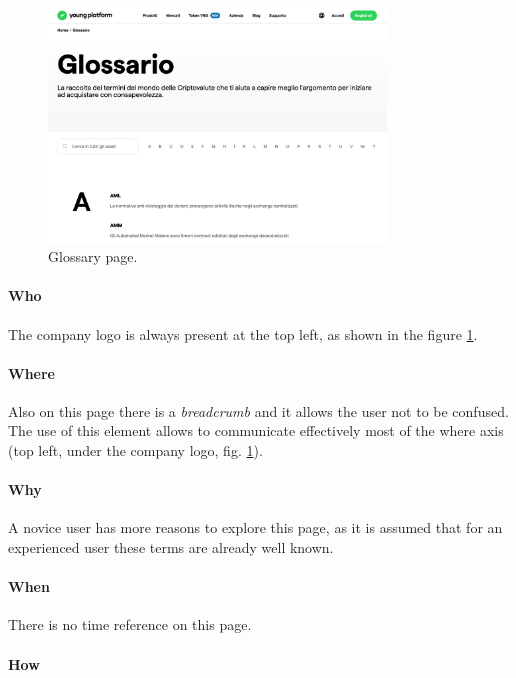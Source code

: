 \begin{figure}[H]
  \centering
  \includegraphics[width=0.80\textwidth]{res/images/internal-pages/glossary/glossary-1.png}
  \caption{Glossary page.}
  \label{fig:glossary-1}
\end{figure}

\paragraph{Who}

The company logo is always present at the top left, as shown in the figure 
\ref{fig:glossary-1}.

\paragraph{Where}

Also on this page there is a \textit{breadcrumb} and it allows the user not 
to be confused. The use of this element allows to communicate effectively 
most of the where axis (top left, under the company logo, fig. 
\ref{fig:glossary-1}).

\paragraph{Why}

A novice user has more reasons to explore this page, as it is assumed that 
for an experienced user these terms are already well known.

\paragraph{When}

There is no time reference on this page.

\paragraph{How}

